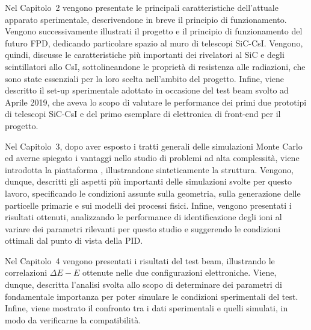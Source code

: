 Nel Capitolo~2 vengono presentate le principali caratteristiche dell'attuale apparato sperimentale, descrivendone in breve il principio di funzionamento.
Vengono successivamente illustrati il progetto e il principio di funzionamento del futuro FPD, dedicando particolare spazio al muro di telescopi SiC-CsI.
Vengono, quindi, discusse le caratteristiche più importanti dei rivelatori al SiC e degli scintillatori allo CsI, sottolineandone le proprietà di resistenza alle radiazioni, che sono state essenziali per la loro scelta nell'ambito del progetto.
Infine, viene descritto il set-up sperimentale adottato in occasione del test beam svolto ad Aprile 2019, che aveva lo scopo di valutare le performance dei primi due prototipi di telescopi SiC-CsI e del primo esemplare di elettronica di front-end per il progetto.

Nel Capitolo~3, dopo aver esposto i tratti generali delle simulazioni Monte Carlo ed averne spiegato i vantaggi nello studio di problemi ad alta complessità, viene introdotta la piattaforma \geant{}, illustrandone sinteticamente la struttura.
Vengono, dunque, descritti gli aspetti più importanti delle simulazioni svolte per questo lavoro, specificando le condizioni assunte sulla geometria, sulla generazione delle particelle primarie e sui modelli dei processi fisici.
Infine, vengono presentati i risultati ottenuti, analizzando le performance di identificazione degli ioni al variare dei parametri rilevanti per questo studio e suggerendo le condizioni ottimali dal punto di vista della PID.
 
Nel Capitolo~4 vengono presentati i risultati del test beam, illustrando le correlazioni $\Delta E - E$ ottenute nelle due configurazioni elettroniche.
Viene, dunque, descritta l'analisi svolta allo scopo di determinare dei parametri di fondamentale importanza per poter simulare le condizioni sperimentali del test.
Infine, viene mostrato il confronto tra i dati sperimentali e quelli simulati, in modo da verificarne la compatibilità.

